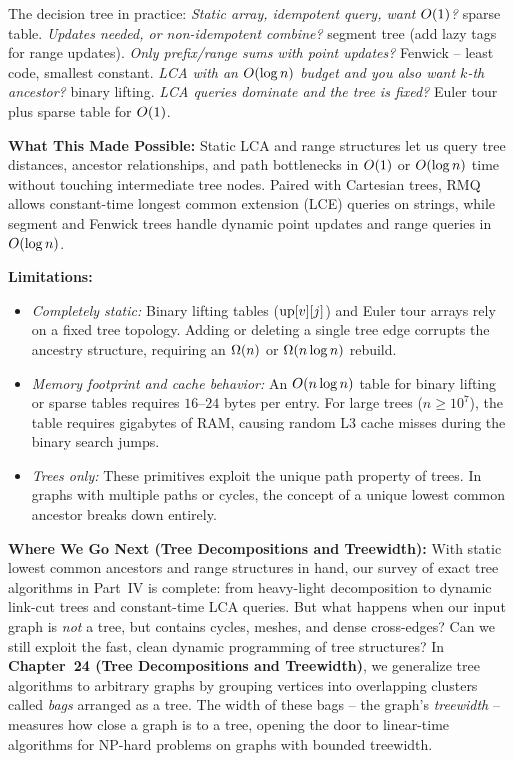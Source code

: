 \begin{focusbox}
The decision tree in practice: \emph{Static array, idempotent query, want $O(1)$?} sparse
table. \emph{Updates needed, or non-idempotent combine?} segment tree (add lazy tags for
range updates). \emph{Only prefix/range sums with point updates?} Fenwick -- least code,
smallest constant. \emph{LCA with an $O(\log n)$ budget and you also want $k$-th ancestor?}
binary lifting. \emph{LCA queries dominate and the tree is fixed?} Euler tour plus sparse
table for $O(1)$.
\end{focusbox}

\begin{connectionbox}
\textbf{What This Made Possible:}
Static LCA and range structures let us query tree distances,
ancestor relationships, and path bottlenecks in $O(1)$ or $O(\log n)$ time without
touching intermediate tree nodes. Paired with Cartesian trees, RMQ allows constant-time
longest common extension (LCE) queries on strings, while segment and Fenwick trees handle
dynamic point updates and range queries in $O(\log n)$.

\textbf{Limitations:}
\begin{itemize}
  \item \emph{Completely static:} Binary lifting tables ($\mathrm{up}[v][j]$) and Euler tour
        arrays rely on a fixed tree topology. Adding or deleting a single tree edge
        corrupts the ancestry structure, requiring an $\Omega(n)$ or $\Omega(n \log n)$
        rebuild.
  \item \emph{Memory footprint and cache behavior:} An $O(n \log n)$ table for binary
        lifting or sparse tables requires $16\text{--}24$ bytes per entry. For large
        trees ($n \ge 10^7$), the table requires gigabytes of RAM, causing random L3
        cache misses during the binary search jumps.
  \item \emph{Trees only:} These primitives exploit the unique path property of trees.
        In graphs with multiple paths or cycles, the concept of a unique lowest common
        ancestor breaks down entirely.
\end{itemize}

\textbf{Where We Go Next (Tree Decompositions and Treewidth):}
With static lowest common ancestors and range structures in hand, our survey of exact tree algorithms in Part~IV is complete: from heavy-light decomposition to dynamic link-cut trees and constant-time LCA queries. But what happens when our input graph is \emph{not} a tree, but contains cycles, meshes, and dense cross-edges? Can we still exploit the fast, clean dynamic programming of tree structures?
In \textbf{Chapter~24 (Tree Decompositions and Treewidth)}, we generalize tree algorithms to arbitrary graphs by grouping vertices into overlapping clusters called \emph{bags} arranged as a tree. The width of these bags -- the graph's \emph{treewidth} -- measures how close a graph is to a tree, opening the door to linear-time algorithms for NP-hard problems on graphs with bounded treewidth.
\end{connectionbox}

